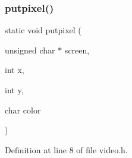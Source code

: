\subsubsection{\texorpdfstring{putpixel()}{putpixel()}}
{\footnotesize\ttfamily static void putpixel (\begin{DoxyParamCaption}\item[{unsigned char $\ast$}]{screen,  }\item[{int}]{x,  }\item[{int}]{y,  }\item[{char}]{color }\end{DoxyParamCaption})\hspace{0.3cm}{\ttfamily [static]}}



Definition at line 8 of file video.\+h.

